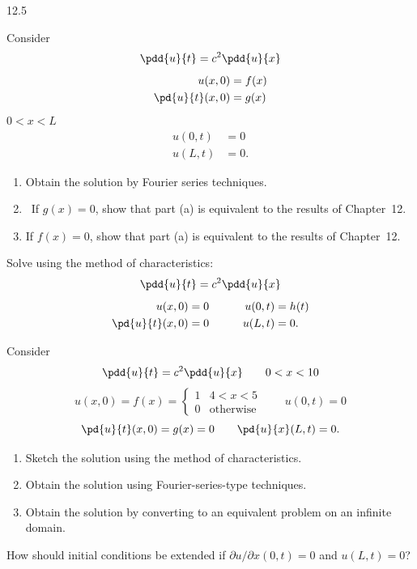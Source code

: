 \begin{exercises}{12.5}

\item \label{ex:12.5.1}
Consider
\[
\pdd{u}{t} = c^2\pdd{u}{x}
\]
\begin{align*}
u(x,0) &= f(x) \\
\pd{u}{t}(x,0) &= g(x)
\end{align*} \quad $0 < x < L$
\begin{align*}
u(0,t) &= 0 \\
u(L,t) &= 0.
\end{align*}
\begin{enumerate}
\item[(a)] Obtain the solution by Fourier series techniques.
\item[(b)]\starred\ If $g(x) = 0$, show that part (a) is equivalent to the results of Chapter~12.
\item[(c)] If $f(x) = 0$, show that part (a) is equivalent to the results of Chapter~12.
\end{enumerate}

\item \label{ex:12.5.2}
Solve using the method of characteristics:
\[
\pdd{u}{t} = c^2\pdd{u}{x}
\]
\begin{align*}
u(x,0) &= 0 \qquad & u(0,t) &= h(t) \\
\pd{u}{t}(x,0) &= 0 \qquad & u(L,t) &= 0.
\end{align*}

\item \label{ex:12.5.3}
Consider
\[
\pdd{u}{t} = c^2\pdd{u}{x} \qquad 0 < x < 10
\]
\[
u(x,0) = f(x) = \begin{cases} 1 & 4 < x < 5 \\ 0 & \text{otherwise} \end{cases} \qquad u(0,t) = 0
\]
\[
\pd{u}{t}(x,0) = g(x) = 0 \qquad \pd{u}{x}(L,t) = 0.
\]
\begin{enumerate}
\item[(a)] Sketch the solution using the method of characteristics.
\item[(b)] Obtain the solution using Fourier-series-type techniques.
\item[(c)] Obtain the solution by converting to an equivalent problem on an infinite domain.
\end{enumerate}

\item \label{ex:12.5.4}
How should initial conditions be extended if $\partial u/\partial x(0,t) = 0$ and $u(L,t) = 0$?

\end{exercises}
